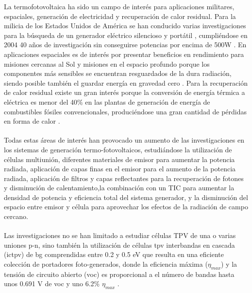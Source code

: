 La termofotovoltaica ha sido un campo de interés para aplicaciones militares, espaciales, generación de electricidad y recuperación de calor residual. Para la milicia de los Estados Unidos de América se han conducido varias investigaciones para la búsqueda de un generador eléctrico silencioso y portátil \cite{military_TPV}, cumpliéndose en 2004 40 años de investigación sin conseguirse potencias por encima de 500W \cite{military_TPV_40Years}. En aplicaciones espaciales es de interés por presentar beneficios en rendimiento para misiones cercanas al Sol y misiones en el espacio profundo porque los componentes más sensibles se encuentran resguardados de la dura radiación, siendo posible también el guardar energía en gravedad cero \cite{TPV_space_applications}. Para la recuperación de calor residual existe un gran interés porque la conversión de energía térmica a eléctrica es menor del 40\% en las plantas de generación de energía de combustibles fósiles convencionales, produciéndose una gran cantidad de pérdidas en forma de calor \cite{wasteHeat_TPV}.\\\\
Todas estas áreas de interés han provocado un aumento de las investigaciones en los sistemas de generación termo-fotovoltaicos, estudiándose la utilización de células multiunión, diferentes materiales de emisor para aumentar la potencia radiada, aplicación de capas finas en el emisor para el aumento de la potencia radiada\cite{doi:Near_field_ThinFilm}, aplicación de filtros \cite{multiLayerFilters} y capas reflectantes para la recuperación de fotones y disminución de calentamiento\cite{thermoionic_TPV_NF},la combinación con un TIC para aumentar la densidad de potencia y eficiencia total del sistema generador\cite{thermoionic_TPV_NF,progress_Thermoionic_TPV}, y la disminución del espacio entre emisor y célula para aprovechar los efectos de la radiación de campo cercano\cite{thermoionic_TPV_NF,modelEfficiency_NF_TPV,nf_TPV_Pillars_SiO2}.\\\\
Las investigaciones no se han limitado a estudiar células TPV de una o varias uniones p-n, sino también la utilización de células \acrshort{tpv} interbandas en cascada (\acrshort{ictpv}) de \acrshort{bg} comprendidas entre 0.2 y 0.5 eV que resulta en una eficiente colección de portadores foto-generados, donde la eficiencia máxima ($\eta_{max}$) y la tensión de circuito abierto (\acrshort{voc}) es proporcional a el número de bandas hasta unos 0.691 V de \acrshort{voc} y uno 6.2\% $\eta_{max}$ \cite{MultiEstados_Capas_TPVs}.\\\\
